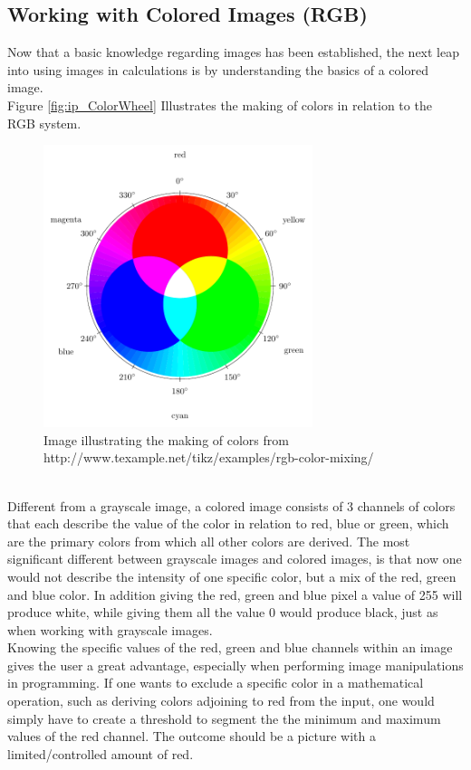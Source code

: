 \subsection{Working with Colored Images (RGB)}
Now that a basic knowledge regarding images has been established, the next leap into using images in calculations is by understanding the basics of a colored image.\\
Figure \eqref{fig:ip_ColorWheel} Illustrates the making of colors in relation to the RGB system.\\
\begin{figure}[htbp]
\centering
\includegraphics[width=0.70\textwidth]{Pictures/Theory/RGBColor.pdf}
\caption{Image illustrating the making of colors from http://www.texample.net/tikz/examples/rgb-color-mixing/}
\label{fig:ip_ColorWheel}
\end{figure}\\
Different from a grayscale image, a colored image consists of 3 channels of colors that each describe the value of the color in relation to red, blue or green, which are the primary colors from which all other colors are derived. The most significant different between grayscale images and colored images, is that now one would not describe the intensity of one specific color, but a mix of the red, green and blue color. In addition giving the red, green and blue pixel a value of 255 will produce white, while giving them all the value 0 would produce black, just as when working with grayscale images.\\
Knowing the specific values of the red, green and blue channels within an image gives the user a great advantage, especially when performing image manipulations in programming. If one wants to exclude a specific color in a mathematical operation, such as deriving colors adjoining to red from the input, one would simply have to create a threshold to segment the the minimum and maximum values of the red channel. The outcome should be a picture with a limited/controlled amount of red. 

